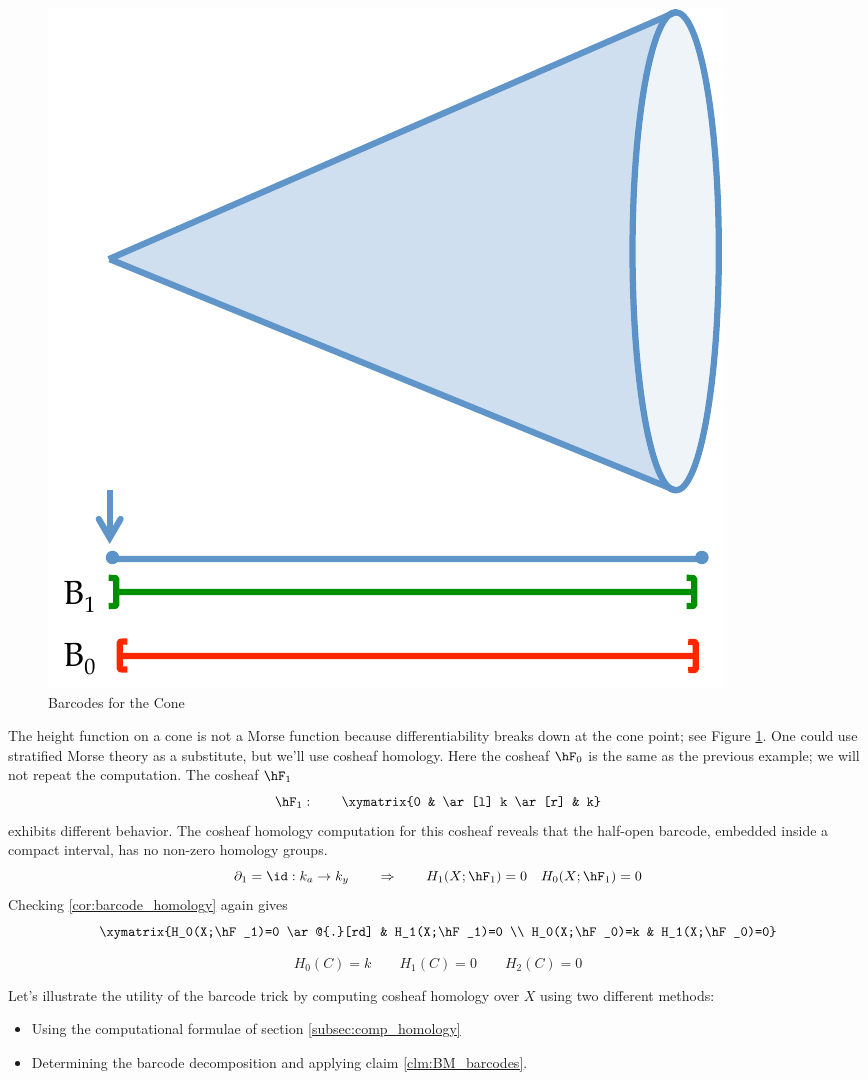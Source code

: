 \begin{ex}

\begin{figure}[ht]
\centering
\includegraphics[width=.7\textwidth]{cone_bcp.pdf}
\caption{Barcodes for the Cone}
\label{fig:cone_bc}
\end{figure}

The height function on a cone is not a Morse function because differentiability breaks down at the cone point; see Figure \ref{fig:cone_bc}. One could use stratified Morse theory as a substitute, but we'll use cosheaf homology. Here the cosheaf $\hF_0$ is the same as the previous example; we will not repeat the computation. The cosheaf $\hF_1$
\[
	\hF_1: \qquad \xymatrix{0 & \ar[l] k \ar[r] & k}
\]
exhibits different behavior. The cosheaf homology computation for this cosheaf reveals that the half-open barcode, embedded inside a compact interval, has no non-zero homology groups.
\[
  \partial_1=\id: k_a \to k_y \qquad \Rightarrow \qquad H_1(X;\hF_1)=0 \quad H_0(X;\hF_1)=0
\]
Checking \ref{cor:barcode_homology} again gives
\[
\xymatrix{H_0(X;\hF_1)=0 \ar@{.}[rd] & H_1(X;\hF_1)=0 \\
H_0(X;\hF_0)=k & H_1(X;\hF_0)=0}
\]

\[
H_0(C)=k \qquad H_1(C)=0 \qquad H_2(C)=0
\]
\end{ex}



Let's illustrate the utility of the barcode trick by computing cosheaf homology over $X$ using two different methods:
\begin{itemize}
	\item Using the computational formulae of section \ref{subsec:comp_homology}
	\item Determining the barcode decomposition and applying claim \ref{clm:BM_barcodes}.
\end{itemize}


